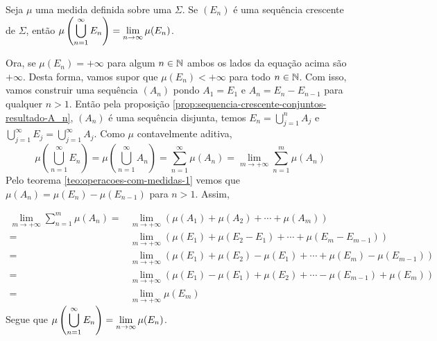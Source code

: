 \begin{proposition}
\label{prop:limite-sequencia-crescente}
Seja $\mu$ uma medida definida sobre uma \sigal $\Sigma$.
Se $(E_n)$ é uma sequência crescente de $\Sigma$, então $\mu\left(\displaystyle \bigcup_{n = 1}^\infty E_n\right) = \displaystyle \lim_{n \to \infty} \mu(E_n)$.
\end{proposition} 

\begin{prova}
    Ora, se $\mu(E_n) = +\infty$ para algum $n \in \operatorname{\mathbb{N}}$ ambos os lados da equação acima são $+\infty$.
    Desta forma, vamos supor que $\mu(E_n) < +\infty$ para todo $n \in \operatorname{\mathbb{N}}$.
    Com isso, vamos construir uma sequência $(A_n)$ pondo $A_1 = E_1$ e $A_n = E_n - E_{n-1}$ para qualquer $n>1$.
    Então pela proposição \ref{prop:sequencia-crescente-conjuntos-resultado-A_n}, $(A_n)$ é uma sequência disjunta, temos $E_n = \bigcup_{j = 1}^n A_j$ e $\bigcup_{j = 1}^\infty E_j = \bigcup_{j = 1}^\infty A_j$.
    Como $\mu$ contavelmente aditiva, 
    $$\mu\left(\bigcup_{n = 1}^\infty E_n\right)
    =\mu\left(\bigcup_{n = 1}^\infty A_n\right)
    = \sum_{n = 1}^\infty \mu(A_n)
    = \lim_{m \to +\infty}\sum_{n = 1}^m \mu(A_n)$$
    Pelo teorema \ref{teo:operacoes-com-medidas-1} vemos que $\mu(A_n) = \mu(E_n) - \mu(E_{n - 1 })$ para $n > 1$.
    Assim, 
    
    \begin{align*}
        \lim_{m \to +\infty}\sum_{n = 1}^m \mu(A_n)
        =&
        \lim_{m \to +\infty}(\mu(A_1) + \mu(A_2) + \cdots +\mu(A_m))\\
        =&
        \lim_{m \to +\infty}(\mu(E_1) + \mu(E_2 - E_1) + \cdots +\mu(E_m - E_{m-1}))\\
        =&
        \lim_{m \to +\infty}(\mu(E_1) + \mu(E_2) - \mu(E_1) + \cdots +\mu(E_m) - \mu(E_{m-1}))\\
        =&
        \lim_{m \to +\infty}(\mu(E_1) - \mu(E_1) + \mu(E_2)  + \cdots  - \mu(E_{m-1}) +\mu(E_m) )\\
        =&
        \lim_{m \to +\infty} \mu(E_m)
    \end{align*}
    Segue que $\mu\left(\displaystyle \bigcup_{n = 1}^\infty E_n\right) = \displaystyle \lim_{n \to \infty} \mu(E_n)$.





    


\end{prova}

